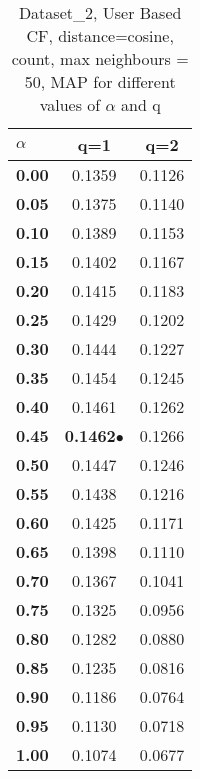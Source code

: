 \begin{table}
\begin{center}
\begin{tabular}{ | l || c | c |}
\hline
\textbf{$\alpha$} & \textbf{q=1} & \textbf{q=2} \\
\hline
\textbf{0.00} & 0.1359 & 0.1126\\
\hline
\textbf{0.05} & 0.1375 & 0.1140\\
\hline
\textbf{0.10} & 0.1389 & 0.1153\\
\hline
\textbf{0.15} & 0.1402 & 0.1167\\
\hline
\textbf{0.20} & 0.1415 & 0.1183\\
\hline
\textbf{0.25} & 0.1429 & 0.1202\\
\hline
\textbf{0.30} & 0.1444 & 0.1227\\
\hline
\textbf{0.35} & 0.1454 & 0.1245\\
\hline
\textbf{0.40} & 0.1461 & 0.1262\\
\hline
\textbf{0.45} & \textbf{0.1462}$\bullet$ & 0.1266\\
\hline
\textbf{0.50} & 0.1447 & 0.1246\\
\hline
\textbf{0.55} & 0.1438 & 0.1216\\
\hline
\textbf{0.60} & 0.1425 & 0.1171\\
\hline
\textbf{0.65} & 0.1398 & 0.1110\\
\hline
\textbf{0.70} & 0.1367 & 0.1041\\
\hline
\textbf{0.75} & 0.1325 & 0.0956\\
\hline
\textbf{0.80} & 0.1282 & 0.0880\\
\hline
\textbf{0.85} & 0.1235 & 0.0816\\
\hline
\textbf{0.90} & 0.1186 & 0.0764\\
\hline
\textbf{0.95} & 0.1130 & 0.0718\\
\hline
\textbf{1.00} & 0.1074 & 0.0677\\
\hline
\end{tabular}
\caption{Dataset\_2, User Based CF, distance=cosine, count, max neighbours = 50, MAP for different values of $\alpha$ and q}
\label{table:MAP_Dataset_2_ucf_cosine_count_mnn=50}
\end{center}
\end{table}
